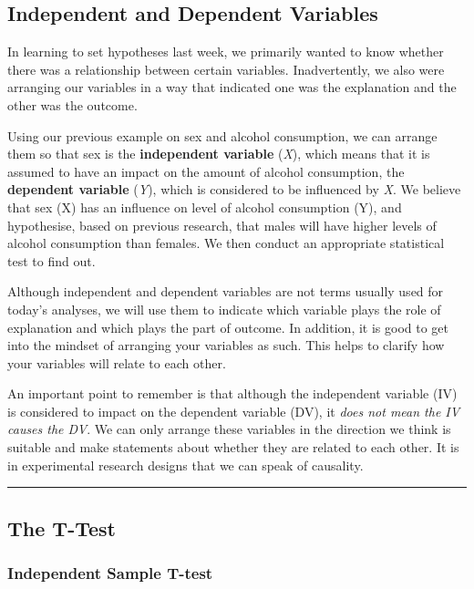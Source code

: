 \documentclass[
]{book}
\begin{document}
\hypertarget{independent-and-dependent-variables}{%
\subsection{Independent and Dependent Variables}\label{independent-and-dependent-variables}}

In learning to set hypotheses last week, we primarily wanted to know whether there was a relationship between certain variables. Inadvertently, we also were arranging our variables in a way that indicated one was the explanation and the other was the outcome.

Using our previous example on sex and alcohol consumption, we can arrange them so that sex is the \textbf{independent variable} (\emph{X}), which means that it is assumed to have an impact on the amount of alcohol consumption, the \textbf{dependent variable} (\emph{Y}), which is considered to be influenced by \emph{X}. We believe that sex (X) has an influence on level of alcohol consumption (Y), and hypothesise, based on previous research, that males will have higher levels of alcohol consumption than females. We then conduct an appropriate statistical test to find out.

Although independent and dependent variables are not terms usually used for today's analyses, we will use them to indicate which variable plays the role of explanation and which plays the part of outcome. In addition, it is good to get into the mindset of arranging your variables as such. This helps to clarify how your variables will relate to each other.

An important point to remember is that although the independent variable (IV) is considered to impact on the dependent variable (DV), it \emph{does not mean the IV causes the DV}. We can only arrange these variables in the direction we think is suitable and make statements about whether they are related to each other. It is in experimental research designs that we can speak of causality.

\begin{center}\rule{0.5\linewidth}{0.5pt}\end{center}

\hypertarget{the-t-test}{%
\subsection{The T-Test}\label{the-t-test}}

\hypertarget{independent-sample-t-test}{%
\subsubsection{Independent Sample T-test}\label{independent-sample-t-test}}
\end{document}

